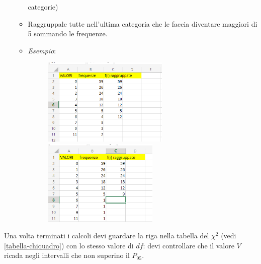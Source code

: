 \begin{enumerate}
\begin{itemize}
                        categorie)
                  \item Raggruppale tutte nell'ultima categoria che le faccia
                        diventare maggiori di 5 sommando le frequenze.
                  \item \textit{Esempio}:
                        \begin{figure}[H]
                              \centering
                              \includegraphics[width=6cm, keepaspectratio]{capitoli/goodnes_of_fit/imgs/vesceragay.png}
                              \includegraphics[width=5.5cm, keepaspectratio]{capitoli/goodnes_of_fit/imgs/POSTAMOLTOGAY.png}
                        \end{figure}
            \end{itemize}
\end{enumerate}

Una volta terminati i calcoli devi guardare la riga nella tabella del $\chi^2$
(vedi \ref{tabella-chiquadro}) con lo stesso valore di $df$: devi controllare che il valore
$V$ ricada negli intervalli che non superino il $P_{95}$.